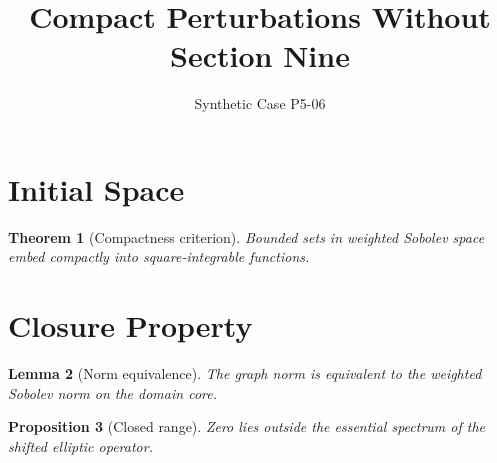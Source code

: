 \documentclass{article}
\title{Compact Perturbations Without Section Nine}
\author{Synthetic Case P5-06}
\newtheorem{thm}{Theorem}[section]
\newtheorem{lem}[thm]{Lemma}
\newtheorem{prop}[thm]{Proposition}
\begin{document}
\maketitle

\section{Initial Space}
\label{sec:initial}

\begin{thm}[Compactness criterion]
\label{thm:compactness}
Bounded sets in weighted Sobolev space embed compactly into square-integrable functions.
\end{thm}

\section{Closure Property}
\label{sec:closure}

\begin{lem}[Norm equivalence]
\label{lem:equiv}
The graph norm is equivalent to the weighted Sobolev norm on the domain core.
\end{lem}

\begin{prop}[Closed range]
\label{prop:closed-range}
Zero lies outside the essential spectrum of the shifted elliptic operator.
\end{prop}
\end{document}
